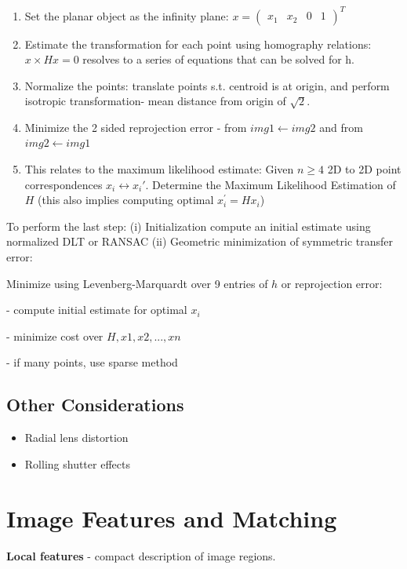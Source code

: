 \begin{enumerate}
\item Set the planar object as the infinity plane: $x = ( \begin{matrix} x_1 & x_2 & 0 & 1 \end{matrix})^T$
\item Estimate the transformation for each point using homography relations: $ x \times H x = 0$ resolves to a series of equations that can be solved for h.
\item Normalize the points: translate points s.t. centroid is at origin, and perform isotropic transformation- mean distance from origin of $\sqrt 2 $. 
\item Minimize the 2 sided reprojection error - from $img1 \leftarrow img2$ and from $img2 \leftarrow img1$
\item This relates to the maximum likelihood estimate:
	Given $n\ge 4$ 2D to 2D point correspondences {$x_i\leftrightarrow x_i\prime$}. 
	Determine the Maximum Likelihood Estimation of $H$ (this also implies computing optimal $x_i^\prime=Hx_i$) 
\end{enumerate}

To perform the last step: 
(i) Initialization compute an initial estimate using normalized DLT or RANSAC
(ii) Geometric minimization of symmetric transfer error: 

Minimize using Levenberg-Marquardt over 9 entries of $h$ or reprojection error:

- compute initial estimate for optimal $x_i$

- minimize cost over ${H,x1,x2,...,xn}$

- if many points, use sparse method

\subsection{Other Considerations}
\begin{itemize}
\item Radial lens distortion
\item Rolling shutter effects
\end{itemize}

\section{Image Features and Matching}

\textbf{Local features} - compact description of image regions.

